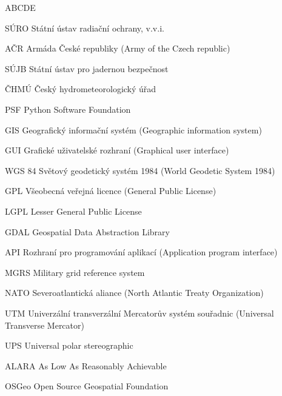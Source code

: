 
\begin{seznamzkratek}{ABCDE}

	      {SÚRO}
	      {Státní ústav radiační ochrany, v.v.i.}
	      
	     {AČR}
	     {Armáda České republiky (Army of the Czech republic)}	  
	     
	      {SÚJB}
	      {Státní ústav pro jadernou bezpečnost}
	      
	      {ČHMÚ}
	      {Český hydrometeorologický úřad}	         
	      
		  {PSF}
	      {Python Software Foundation}

	      {GIS}
	      {Geografický informační systém (Geographic information system)}
	         
	      {GUI}
	      {Grafické uživatelské rozhraní (Graphical user interface)}
	           
	      {WGS 84}
	      {Světový geodetický systém 1984 (World Geodetic System 1984)}

	      {GPL}
	      {Všeobecná veřejná licence (General Public License)}
	      
	      {LGPL}
	      {Lesser General Public License}	      
	      
	      {GDAL}
	      {Geospatial Data Abstraction Library}
	      
	      {API}
	      {Rozhraní pro programování aplikací (Application program interface)}	      
	    
	      {MGRS}
	      {Military grid reference system}
	      
	      {NATO}
	      {Severoatlantická aliance (North Atlantic Treaty Organization)}
	      
	      {UTM}
	      {Univerzální transverzální Mercatorův systém souřadnic (Universal Transverse Mercator)}	
	      
	      {UPS}
	      {Universal polar stereographic}	
	      
	      {ALARA}
	      {As Low As Reasonably Achievable}     
	      
	      {OSGeo}
	      {Open Source Geospatial Foundation} 
	      

\end{seznamzkratek}
